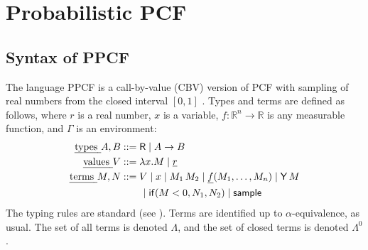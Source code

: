 \section{Probabilistic PCF}
\label{sec:PPCF}

\subsection{Syntax of PPCF}

The language PPCF is a call-by-value (CBV) version of PCF with sampling of real numbers from the closed interval $[0,1]$ \cite{Ehrhard2018c,DBLP:journals/pacmpl/EhrhardPT18,DBLP:conf/esop/MakOPW21}.
Types and terms are defined as follows, where $r$ is a real number, $x$ is a variable, $f : \mathbb{R}^n \to \mathbb{R}$ is any measurable function, and $\Gamma$ is an environment:
\begin{align*}
  \text{\em types } A, B &::= \textsf{R}  \mid  A \to B \\
  \text{\em values } V &::= \lambda x.M  \mid  \underline{r} \\
  \text{\em terms } M, N &::= V  \mid  x  \mid  M_1 \, M_2  \mid  \underline{f}(M_1,\dots ,M_n)  \mid  \mathsf{Y} \, M \\
   & \qquad \mid  \mathsf{if}(M < 0, N_1, N_2)  \mid  \mathsf{sample}
\end{align*}
The typing rules are standard (see ).
Terms are identified up to $\alpha$-equivalence, as usual. 
The set of all terms is denoted $\Lambda$, and the set of closed terms is denoted $\Lambda^0$.


